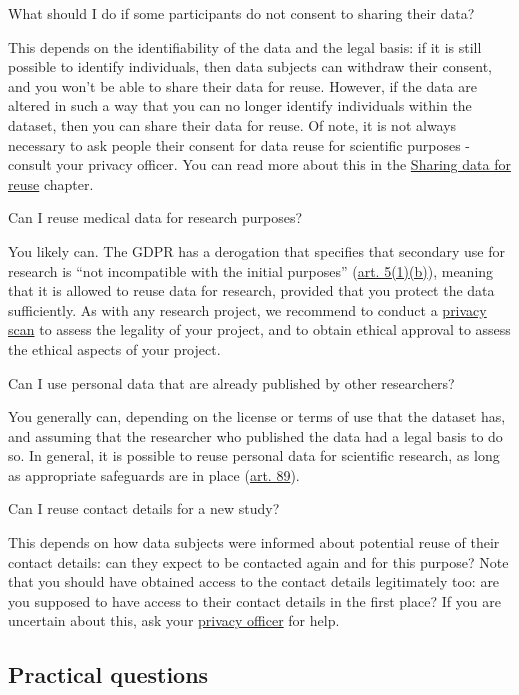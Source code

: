 \documentclass[
]{book}
\begin{document}
What should I do if some participants do not consent to sharing their data?

This depends on the identifiability of the data and the legal basis: if it is still possible to identify individuals, then data subjects can withdraw their consent, and you won't be able to share their data for reuse. However, if the data are altered in such a way that you can no longer identify individuals within the dataset, then you can share their data for reuse. Of note, it is not always necessary to ask people their consent for data reuse for scientific purposes - consult your privacy officer. You can read more about this in the \protect\hyperlink{data-sharing-reuse}{Sharing data for reuse} chapter.

Can I reuse medical data for research purposes?

You likely can. The GDPR has a derogation that specifies that secondary use for research is ``not incompatible with the initial purposes'' (\href{https://gdpr-info.eu/art-5-gdpr/}{art. 5(1)(b)}), meaning that it is allowed to reuse data for research, provided that you protect the data sufficiently. As with any research project, we recommend to conduct a \protect\hyperlink{privacy-scan}{privacy scan} to assess the legality of your project, and to obtain ethical approval to assess the ethical aspects of your project.

Can I use personal data that are already published by other researchers?

You generally can, depending on the license or terms of use that the dataset has, and assuming that the researcher who published the data had a legal basis to do so. In general, it is possible to reuse personal data for scientific research, as long as appropriate safeguards are in place (\href{https://gdpr-info.eu/art-89-gdpr/}{art. 89}).

Can I reuse contact details for a new study?

This depends on how data subjects were informed about potential reuse of their contact details: can they expect to be contacted again and for this purpose? Note that you should have obtained access to the contact details legitimately too: are you supposed to have access to their contact details in the first place? If you are uncertain about this, ask your \protect\hyperlink{support}{privacy officer} for help.

\hypertarget{practical-questions}{%
\subsection{Practical questions}\label{practical-questions}}
\end{document}
